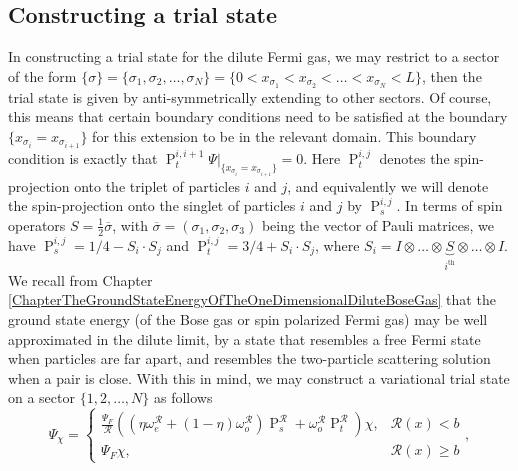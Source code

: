 \subsection{Constructing a trial state}
In constructing a trial state for the dilute Fermi gas, we may restrict to a sector of the form $ \{\sigma\}=\{\sigma_1,\sigma_2,\ldots,\sigma_N\}=\{0<x_{\sigma_1}<x_{\sigma_2}<\ldots<x_{\sigma_N}<L\} $, then the trial state is given by anti-symmetrically extending to other sectors. Of course, this means that certain boundary conditions need to be satisfied at the boundary $ \{x_{\sigma_i}=x_{\sigma_{i+1}}\} $ for this extension to be in the relevant domain. This boundary condition is exactly that $ \operatorname{P}_t^{i,i+1} \Psi\rvert_{\{x_{\sigma_i}=x_{\sigma_{i+1}}\}}=0 $. Here $ \operatorname{P}_t^{i,j} $ denotes the spin-projection onto the triplet of particles $ i $ and $ j $, and equivalently we will denote the spin-projection onto the singlet of particles $ i $ and $ j $ by $ \operatorname{P}_s^{i,j} $. In terms of spin operators $S=\frac{1}{2}\overline{\sigma}$, with $\overline{\sigma}=(\sigma_1,\sigma_2,\sigma_3)$ being the vector of Pauli matrices, we have $\operatorname{P}_s^{i,j}=1/4-S_i\cdot S_j$ and $\operatorname{P}_t^{i,j}=3/4+S_i\cdot S_j$, where $S_i=I\otimes\ldots\otimes \underbrace{S}_{i^{\text{th}}}\otimes\ldots\otimes I$.  We recall from Chapter \ref{ChapterTheGroundStateEnergyOfTheOneDimensionalDiluteBoseGas} that the ground state energy (of the Bose gas or spin polarized Fermi gas) may be well approximated in the dilute limit, by a state that resembles a free Fermi state when particles are far apart, and resembles the two-particle scattering solution when a pair is close. With this in mind, we may construct a variational trial state on a sector $ \{1,2,\ldots,N\} $ as follows\begin{equation}\label{EqTrial StateSpin1/2Fermi}
\Psi_\chi=\begin{cases}
\frac{\Psi_F}{\mathcal{R}}\left(\left(\eta\omega^{\mathcal{R}}_e+(1-\eta)\omega^{\mathcal{R}}_o\right)\operatorname{P}_s^{\mathcal{R}}+\omega_o^{\mathcal{R}}\operatorname{P}_t^{\mathcal{R}}\right)\chi,&\mathcal{R}(x)<b\\
\Psi_F\chi ,&\mathcal{R}(x)\geq b
\end{cases},
\end{equation}
